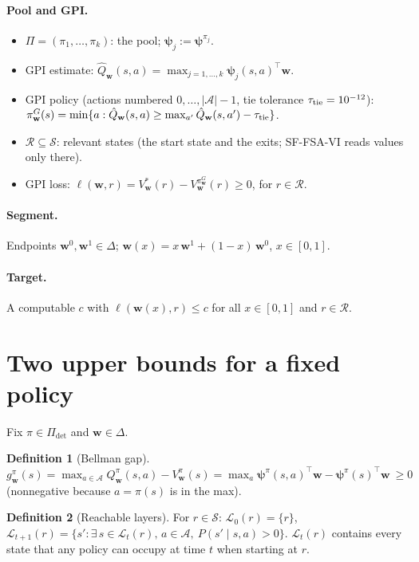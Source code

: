 \documentclass[11pt]{article}
\newcommand{\vpsi}{\bm{\psi}}
\newcommand{\w}{\mathbf{w}}
\newcommand{\cS}{\mathcal S}
\newcommand{\cA}{\mathcal A}
\newcommand{\cR}{\mathcal R}
\newcommand{\cL}{\mathcal L}
\theoremstyle{definition}
\newtheorem{definition}{Definition}
\begin{document}
\paragraph{Pool and GPI.}
\begin{itemize}
\item $\Pi=(\pi_1,\dots,\pi_k)$: the pool; $\vpsi_j:=\vpsi^{\pi_j}$.
\item GPI estimate: $\hat Q_\w(s,a)=\max_{j=1,\dots,k}\vpsi_j(s,a)^\top\w$.
\item GPI policy (actions numbered $0,\dots,|\cA|-1$, tie tolerance $\tau_{\rm tie}=10^{-12}$):
$\pi^G_\w(s)=\min\{a:\hat Q_\w(s,a)\ge\max_{a'}\hat Q_\w(s,a')-\tau_{\rm tie}\}$.
\item $\cR\subseteq\cS$: relevant states (the start state and the exits; SF-FSA-VI reads values only there).
\item GPI loss: $\ell(\w,r)=V^*_\w(r)-V^{\pi^G_\w}_\w(r)\ge0$, for $r\in\cR$.
\end{itemize}

\paragraph{Segment.} Endpoints $\w^0,\w^1\in\Delta$; $\w(x)=x\,\w^1+(1-x)\,\w^0$, $x\in[0,1]$.

\paragraph{Target.} A computable $c$ with $\ell(\w(x),r)\le c$ for all $x\in[0,1]$ and $r\in\cR$.

\section{Two upper bounds for a fixed policy}

Fix $\pi\in\Pi_{\det}$ and $\w\in\Delta$.

\begin{definition}[Bellman gap]
$g^\pi_\w(s)=\max_{a\in\cA}Q^\pi_\w(s,a)-V^\pi_\w(s)=\max_a\vpsi^\pi(s,a)^\top\w-\vpsi^\pi(s)^\top\w\ \ge0$
(nonnegative because $a=\pi(s)$ is in the max).
\end{definition}

\begin{definition}[Reachable layers]
For $r\in\cS$: $\cL_0(r)=\{r\}$,\quad $\cL_{t+1}(r)=\{s':\exists\,s\in\cL_t(r),\,a\in\cA,\ P(s'\mid s,a)>0\}$.
$\cL_t(r)$ contains every state that any policy can occupy at time $t$ when starting at $r$.
\end{definition}
\end{document}

